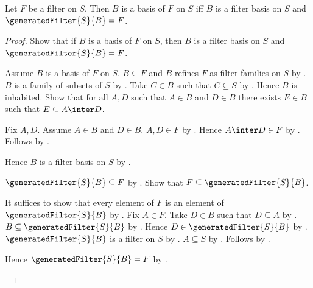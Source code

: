 \begin{theorem}\label{filter_basis_of_iff_generated_filter}
    Let $F$ be a filter on $S$.
    Then $B$ is a basis of $F$ on $S$ iff
        $B$ is a filter basis on $S$ and
        $\generatedFilter{S}{B}=F$.
\end{theorem}
\begin{proof}
    Show that if $B$ is a basis of $F$ on $S$, then
        $B$ is a filter basis on $S$ and
        $\generatedFilter{S}{B}=F$.
    \begin{subproof}
        Assume $B$ is a basis of $F$ on $S$.
        $B\subseteq F$ and
            $B$ refines $F$ as filter families on $S$
            by .
        $B$ is a family of subsets of $S$
            by .
        Take $C\in B$ such that $C\subseteq S$
            by .
        Hence $B$ is inhabited.
        Show that for all $A,D$ such that $A\in B$ and $D\in B$
            there exists $E\in B$ such that $E\subseteq A\inter D$.
        \begin{subproof}
            Fix $A,D$.
            Assume $A\in B$ and $D\in B$.
            $A,D\in F$ by .
            Hence $A\inter D\in F$ by .
            Follows by .
        \end{subproof}
        Hence $B$ is a filter basis on $S$ by .

        $\generatedFilter{S}{B}\subseteq F$
            by .
        Show that $F\subseteq\generatedFilter{S}{B}$.
        \begin{subproof}
            It suffices to show that every element of $F$ is an element of
                $\generatedFilter{S}{B}$ by .
            Fix $A\in F$.
            Take $D\in B$ such that $D\subseteq A$
                by .
            $B\subseteq\generatedFilter{S}{B}$ by
                .
            Hence $D\in\generatedFilter{S}{B}$ by .
            $\generatedFilter{S}{B}$ is a filter on $S$ by
                .
            $A\subseteq S$ by .
            Follows by .
        \end{subproof}
        Hence $\generatedFilter{S}{B}=F$
            by .
    \end{subproof}


\end{proof}
